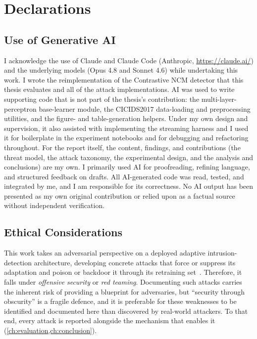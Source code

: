 \chapter{Declarations}
\label{ch:declarations}

\section{Use of Generative AI}
I acknowledge the use of Claude and Claude Code (Anthropic, \url{https://claude.ai/}) and the underlying models (Opus 4.8 and Sonnet 4.6) while undertaking this work. I wrote the reimplementation of the Contrastive NCM detector that this thesis evaluates and all of the attack implementations. AI was used to write supporting code that is not part of the thesis's contribution: the multi-layer-perceptron base-learner module, the CICIDS2017 data-loading and preprocessing utilities, and the figure- and table-generation helpers. Under my own design and supervision, it also assisted with implementing the streaming harness and I used it for boilerplate in the experiment notebooks and for debugging and refactoring throughout. For the report itself, the content, findings, and contributions (the threat model, the attack taxonomy, the experimental design, and the analysis and conclusions) are my own. I primarily used AI for proofreading, refining language, and structured feedback on drafts. All AI-generated code was read, tested, and integrated by me, and I am responsible for its correctness. No AI output has been presented as my own original contribution or relied upon as a factual source without independent verification.

\section{Ethical Considerations}
This work takes an adversarial perspective on a deployed adaptive intrusion-detection architecture, developing concrete attacks that force or suppress its adaptation and poison or backdoor it through its retraining set~\cite{Kuppa_2022}. Therefore, it falls under \emph{offensive security} or \emph{red teaming}. Documenting such attacks carries the inherent risk of providing a blueprint for adversaries, but ``security through obscurity'' is a fragile defence, and it is preferable for these weaknesses to be identified and documented here than discovered by real-world attackers. To that end, every attack is reported alongside the mechanism that enables it (\cref{ch:evaluation,ch:conclusion}).

